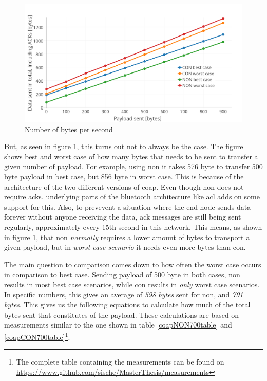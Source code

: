 \begin{figure}[ht]
    \centering
    \includegraphics[width=1.0\textwidth]{bestCaseworstCase3.png}    
    \caption{Number of bytes per second}
    \label{fig:bestCaseworstCase}
\end{figure}

\noindent But, as seen in figure \ref{fig:bestCaseworstCase}, this turns out not to always be the case. The figure shows best and worst case of how many bytes that needs to be sent to transfer a given number of \gls{payload}. For example, using \gls{non} it takes 576 byte to transfer 500 byte payload in best case, but 856 byte in worst case. This is because of the architecture of the two different versions of \gls{coap}. Even though \gls{non} does not require \glspl{ack}, underlying parts of the bluetooth architecture like \gls{acl} adds on some support for this. Also, to prevevent a situation where the end node sends data forever without anyone receiving the data, \gls{ack} messages are still being sent regularly, approximately every 15th second in this network. This means, as shown in figure \ref{fig:bestCaseworstCase}, that \gls{non} \textit{normally} requires a lower amount of bytes to transport a given \gls{payload}, but in \textit{worst case scenario} it needs even more bytes than \gls{con}. 






\noindent The main question to comparison comes down to how often the worst case occurs in comparison to best case. Sending payload of 500 byte in both cases, \gls{non} results in most best case scenarios, while \gls{con} results in \textit{only} worst case scenarios. In specific numbers, this gives an average of \textit{598 bytes} sent for \gls{non}, and \textit{791 bytes}. This gives us the following equations to calculate how much of the total bytes sent that constitutes of the \gls{payload}. These calculations are based on measurements similar to the one shown in table \ref{coapNON700table} and \ref{coapCON700table}\footnote{The complete table containing the measurements can be found on \url{https://www.github.com/sische/MasterThesis/measurements}}. 



